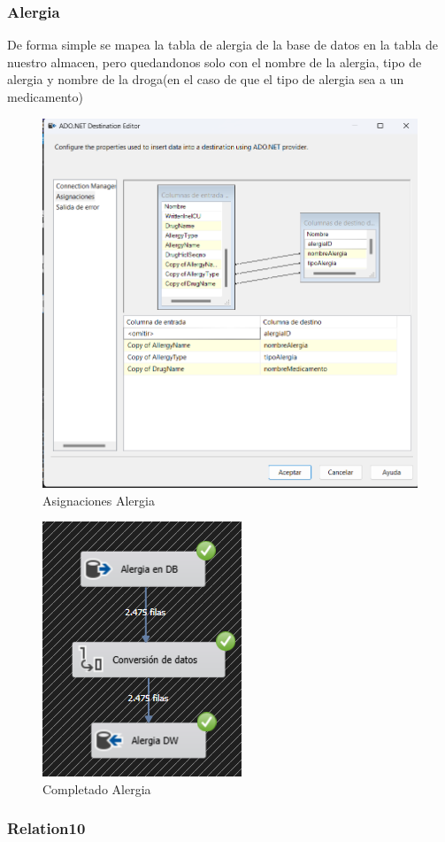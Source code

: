 \documentclass{article}
\begin{document}
	\subsubsection{Alergia}
	De forma simple se mapea la tabla de alergia de la base de datos en la tabla de nuestro almacen, pero quedandonos solo con el nombre de la alergia, tipo de alergia y nombre de la droga(en el caso de que el tipo de alergia sea a un medicamento)
	\begin{figure}[H]
		\centering
		\includegraphics[width=.7\linewidth]{./images/asignaciones/alergia.png}
		\caption{Asignaciones Alergia}
	\end{figure}
	\begin{figure}[H]
		\centering
		\includegraphics[width=.3\linewidth]{./images/completados/alergia.png}
		\caption{Completado Alergia}
	\end{figure}
	\subsubsection{Relation10}
	
\end{document}
